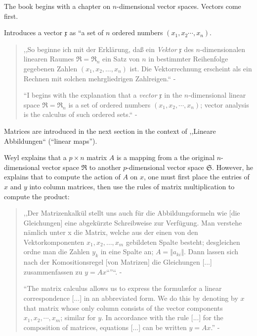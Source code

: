 The book begins with a chapter on $n$-dimensional vector spaces.
Vectors come first.

Introduces a vector $\mathfrak x$ as ``a set of $n$ ordered numbers $(x_1, x_2 \cdots, x_n)$.

\begin{quote}
,,So beginne ich mit der Erklärung, daß ein \textit{Vektor} $\mathfrak x$ des $n$-dimensionalen linearen Raumes
$\mathfrak R = \mathfrak R_n$
ein Satz von $n$ in bestimmter Reihenfolge gegebenen Zahlen $(x_1, x_2, \dots, x_n)$
ist. Die Vektorrechnung erscheint als ein Rechnen mit solchen mehrgliedrigen
Zahlreigen.`` - \cite[p. 4]{Weyl1928}

``I begins with the explanation that a \textit{vector} $\mathfrak x$ in the $n$-dimensional
linear space $\mathfrak R = \mathfrak R_n$ is a set of ordered numbers $(x_1, x_2, \cdots, x_n)$;
vector analysis is the calculus of such ordered sets.`` - \cite[p. 1]{Weyl1931}
\end{quote}

Matrices are introduced in the next section in the context of ,,Lineare Abbildungen``
(``linear maps'').

Weyl explains that a $p \times n$ matrix $A$ is a mapping from a the original
$n$-dimensional vector space $\mathfrak R$ to another $p$-dimensional vector space
$\mathfrak S$. However, he explains that to compute the action of $A$ on $x$, one
must first place the entries of $x$ and $y$ into column matrices, then use the
rules of matrix multiplication to compute the product:

\begin{quote}
,,Der Matrizenkalkül stellt uns auch für die Abbildungsformeln wie [die Gleichungen]
 eine abgekürzte Schreibweise zur Verfügung. Man verstehe nämlich unter x die Matrix, welche aus der einen von den Vektorkomponenten $x_1, x_2, \dots, x_m$ gebildeten Spalte besteht; desgleichen ordne man die Zahlen $y_k$ in eine Spalte an; $A = \Vert a_{ki} \Vert$. Dann lassen sich nach der Komositionsregel [von Matrizen] die Gleichungen [...] zusammenfassen zu $y = Ax$``''``. - \cite[p. 10]{Weyl1928}

``The matrix calculus allows us to express the formul\ae for
a linear correspondence [...] in an abbreviated form.
We do this by denoting by $x$ that matrix whose only column consists of the
vector components $x_1, x_2, \cdots, x_m$; similar
for $y$. In accordance with the rule [...] for the composition of
matrices, equations [...] can be written $y = Ax$.'' - \cite[p. 8]{Weyl1931}
\end{quote}

